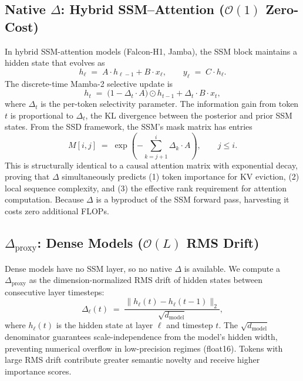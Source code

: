 \documentclass[11pt]{article}
\newcommand{\dsig}{\Delta}
\newcommand{\proxydsig}{\ensuremath{\dsig_{\mathrm{proxy}}}}
\newcommand{\Order}{\mathcal{O}}
\begin{document}
\subsection{Native $\dsig$: Hybrid SSM--Attention (\texorpdfstring{$\Order(1)$}{O(1)} Zero-Cost)}
In hybrid SSM-attention models (Falcon-H1, Jamba), the SSM block maintains a
hidden state that evolves as
\begin{equation}\label{eq:ssm}
  h_\ell \;=\; A \cdot h_{\ell-1} + B \cdot x_\ell, \qquad y_\ell \;=\; C \cdot h_\ell.
\end{equation}
The discrete-time Mamba-2 selective update is
\begin{equation}\label{eq:mamba}
  h_t \;=\; \bigl(1 - \dsig_t \cdot A\bigr) \odot h_{t-1} + \dsig_t \cdot B \cdot x_t,
\end{equation}
where $\dsig_t$ is the per-token selectivity parameter. The information gain
from token $t$ is proportional to $\dsig_t$, the KL divergence between the
posterior and prior SSM states. From the SSD framework, the SSM's mask
matrix has entries
\begin{equation}\label{eq:ssd}
  M[i,j] \;=\; \exp\!\left(-\sum_{k=j+1}^{i} \dsig_k \cdot A\right),\qquad j \le i.
\end{equation}
This is structurally identical to a causal attention matrix with exponential
decay, proving that $\dsig$ simultaneously predicts (1) token importance for
KV eviction, (2) local sequence complexity, and (3) the effective rank
requirement for attention computation. Because $\dsig$ is a byproduct of the
SSM forward pass, harvesting it costs zero additional FLOPs.

\subsection{$\proxydsig$: Dense Models (\texorpdfstring{$\Order(L)$}{O(L)} RMS Drift)}
Dense models have no SSM layer, so no native $\dsig$ is available. We compute
a $\proxydsig$ as the dimension-normalized RMS drift of hidden states between
consecutive layer timesteps:
\begin{equation}\label{eq:proxy}
  \dsig_\ell(t) \;=\; \frac{\| h_\ell(t) - h_\ell(t-1) \|_2}{\sqrt{d_{\mathrm{model}}}},
\end{equation}
where $h_\ell(t)$ is the hidden state at layer $\ell$ and timestep $t$. The
$\sqrt{d_{\mathrm{model}}}$ denominator guarantees scale-independence from
the model's hidden width, preventing numerical overflow in low-precision
regimes (float16). Tokens with large RMS drift contribute greater semantic
novelty and receive higher importance scores.
\end{document}
